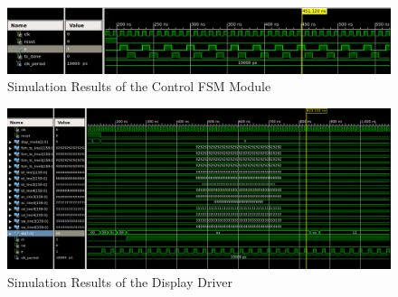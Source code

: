 \documentclass[a4paper]{article}
\begin{document}
\begin{figure}[h!]
  \begin{center}
    \includegraphics[width=\textwidth]{CONTROL_FSM_SC.png}
    \caption{Simulation Results of the Control FSM Module}
    \label{fig:CONTROL_FSM_SC}
  \end{center}
\end{figure}
 
\begin{figure}[h!]
  \begin{center}
    \includegraphics[width=\textwidth]{simulation.png}
    \caption{Simulation Results of the Display Driver}
    \label{fig:simulation}
  \end{center}
\end{figure}
\end{document}
